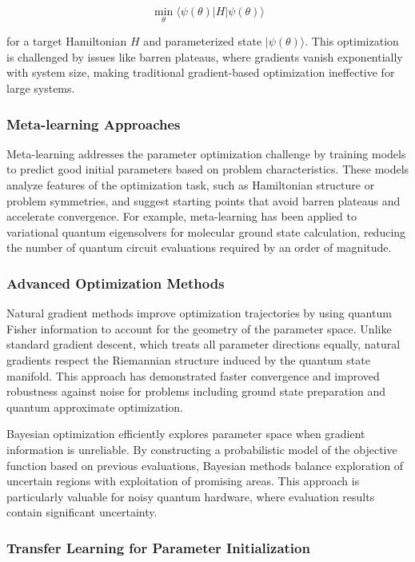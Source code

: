 \begin{equation}
\min_{\theta} \langle \psi(\theta) | H | \psi(\theta) \rangle
\end{equation}

for a target Hamiltonian $H$ and parameterized state $|\psi(\theta)\rangle$. This optimization is challenged by issues like barren plateaus, where gradients vanish exponentially with system size, making traditional gradient-based optimization ineffective for large systems.

\subsubsection{Meta-learning Approaches}

Meta-learning addresses the parameter optimization challenge by training models to predict good initial parameters based on problem characteristics. These models analyze features of the optimization task, such as Hamiltonian structure or problem symmetries, and suggest starting points that avoid barren plateaus and accelerate convergence. For example, meta-learning has been applied to variational quantum eigensolvers for molecular ground state calculation, reducing the number of quantum circuit evaluations required by an order of magnitude.

\subsubsection{Advanced Optimization Methods}

Natural gradient methods improve optimization trajectories by using quantum Fisher information to account for the geometry of the parameter space. Unlike standard gradient descent, which treats all parameter directions equally, natural gradients respect the Riemannian structure induced by the quantum state manifold. This approach has demonstrated faster convergence and improved robustness against noise for problems including ground state preparation and quantum approximate optimization.

Bayesian optimization efficiently explores parameter space when gradient information is unreliable. By constructing a probabilistic model of the objective function based on previous evaluations, Bayesian methods balance exploration of uncertain regions with exploitation of promising areas. This approach is particularly valuable for noisy quantum hardware, where evaluation results contain significant uncertainty.

\subsubsection{Transfer Learning for Parameter Initialization}

